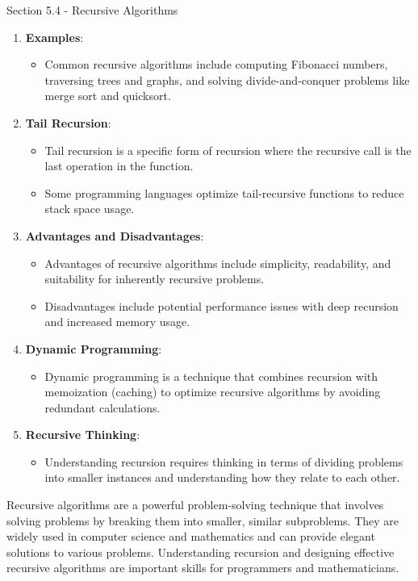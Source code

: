 \begin{notes}{Section 5.4 - Recursive Algorithms}
\begin{enumerate}
        \item \textbf{Examples}:
        \begin{itemize}
            \item Common recursive algorithms include computing Fibonacci numbers, traversing trees and graphs, and solving divide-and-conquer problems like merge sort and quicksort.
        \end{itemize}
        
        \item \textbf{Tail Recursion}:
        \begin{itemize}
            \item Tail recursion is a specific form of recursion where the recursive call is the last operation in the function.
            \item Some programming languages optimize tail-recursive functions to reduce stack space usage.
        \end{itemize}
        
        \item \textbf{Advantages and Disadvantages}:
        \begin{itemize}
            \item Advantages of recursive algorithms include simplicity, readability, and suitability for inherently recursive problems.
            \item Disadvantages include potential performance issues with deep recursion and increased memory usage.
        \end{itemize}
        
        \item \textbf{Dynamic Programming}:
        \begin{itemize}
            \item Dynamic programming is a technique that combines recursion with memoization (caching) to optimize recursive algorithms by avoiding redundant calculations.
        \end{itemize}
        
        \item \textbf{Recursive Thinking}:
        \begin{itemize}
            \item Understanding recursion requires thinking in terms of dividing problems into smaller instances and understanding how they relate to each other.
        \end{itemize}
    \end{enumerate}
    
    Recursive algorithms are a powerful problem-solving technique that involves solving problems by breaking them into smaller, similar subproblems. They are widely used in computer science and mathematics 
    and can provide elegant solutions to various problems. Understanding recursion and designing effective recursive algorithms are important skills for programmers and mathematicians.
\end{notes}